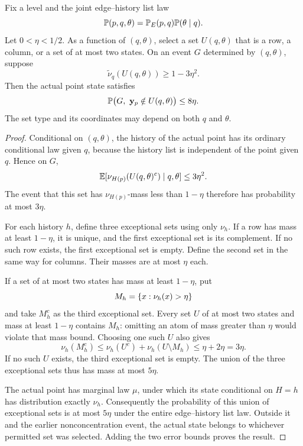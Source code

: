 \begin{lemma}\label{com:transfer}
Fix a level and the joint edge--history list law
\[
 \mathbb P(p,q,\theta)=\mathbb P_E(p,q)\mathbb P(\theta\mid q).
\]
Let \(0<\eta<1/2\). As a function of \((q,\theta)\), select a set
\(U(q,\theta)\) that is a row, a column, or a set of at most two states.
On an event \(G\) determined by \((q,\theta)\), suppose
\[
 \widetilde\nu_q(U(q,\theta))\ge1-3\eta^2.
\]
Then the actual point state satisfies
\[
 \mathbb P\bigl(G,\ \mathbf y_p\notin U(q,\theta)\bigr)\le8\eta.
\]
The set type and its coordinates may depend on both \(q\) and \(\theta\).
\end{lemma}

\begin{proof}
Conditional on \((q,\theta)\), the history of the actual point has its
ordinary conditional law given \(q\), because the history list is independent of
the point given \(q\). Hence on \(G\),
\[
 \mathbb E[\nu_{H(p)}(U(q,\theta)^c)\mid q,\theta]\le3\eta^2.
\]
The event that this set has \(\nu_{H(p)}\)-mass less than \(1-\eta\)
therefore has probability at most \(3\eta\).

For each history \(h\), define three exceptional sets using only \(\nu_h\).
If a row has mass at least \(1-\eta\), it is unique, and the first exceptional
set is its complement. If no such row exists, the first exceptional set is
empty. Define the second set in the same way for columns. Their masses are
at most \(\eta\) each.

If a set of at most two states has mass at least \(1-\eta\), put
\[
 M_h=\{x:\nu_h(x)>\eta\}
\]
and take \(M_h^c\) as the third exceptional set. Every set \(U\) of at most
two states and mass at least \(1-\eta\) contains \(M_h\): omitting an atom
of mass greater than \(\eta\) would violate that mass bound. Choosing one
such \(U\) also gives
\[
 \nu_h(M_h^c)\le\nu_h(U^c)+\nu_h(U\setminus M_h)
                 \le\eta+2\eta=3\eta.
\]
If no such \(U\) exists, the third exceptional set is empty. The union of
the three exceptional sets thus has mass at most \(5\eta\).

The actual point has marginal law \(\mu\), under which its state conditional
on \(H=h\) has distribution exactly \(\nu_h\). Consequently the probability
of this union of exceptional sets is at most \(5\eta\) under the entire
edge--history list law. Outside it and the earlier nonconcentration event, the
actual state belongs to whichever permitted set was selected. Adding
the two error bounds proves the result.
\end{proof}

